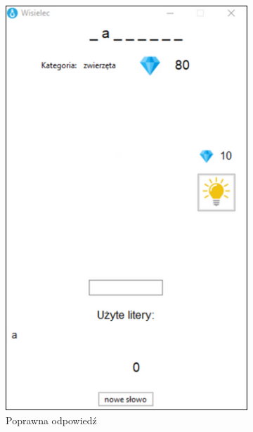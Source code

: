 \documentclass[]{report}
\begin{document}
\begin{figure}[h]
	\centering
	\begin{subfigure}{0.4\textwidth}
		\centering
		\includegraphics[width=\linewidth]{5}
		\caption{Poprawna odpowiedź}
		\label{fig:poprawna_odpowiedz}
	\end{subfigure}
	\hspace{1cm} %
	\begin{subfigure}{0.4\textwidth}
			\centering

\end{subfigure}
\end{figure}
\end{document}
